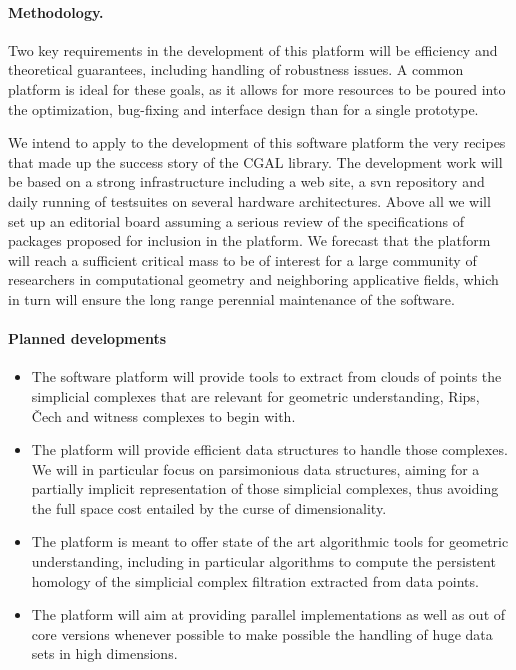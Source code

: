 \paragraph{ Methodology.} 
Two key requirements in the development of this platform will be
efficiency and theoretical guarantees, including handling of
robustness issues. A common
platform is ideal for these goals, as it allows for more
resources to be poured into the optimization, bug-fixing and interface
design than for a single prototype.

 We intend to apply to the development of this software platform 
the very  recipes that made up the success story
of the CGAL library. 
The development work will be based on a strong infrastructure
including a web site, a svn repository and  daily running of testsuites on several  hardware architectures.
Above all we will set up  an editorial board assuming a  serious review of the 
specifications of packages proposed for inclusion in the platform.
We forecast that the platform will reach a sufficient critical mass
to be of interest for a large community of researchers in
computational geometry and neighboring applicative fields,
which in turn will ensure the long range perennial maintenance
of the software.



\paragraph{Planned developments} 
\begin{itemize}
\item The software platform will provide tools to extract from clouds of points the
simplicial complexes that are relevant for geometric understanding,
Rips, \v Cech and witness complexes to begin with. 
\item The platform will provide efficient data structures to handle those
complexes. We will in particular  focus on parsimonious data
structures, aiming for a partially implicit representation of those simplicial
complexes, thus avoiding the full space cost entailed by the curse of
dimensionality. 
\item The platform is meant to offer state of the art algorithmic tools for geometric
understanding,
including in particular algorithms to compute the persistent homology
of the simplicial complex filtration extracted from data points. 
\item The platform will aim at providing parallel implementations as well
as out of core versions whenever possible to make possible the
handling of huge data sets in high dimensions.
\end{itemize}

